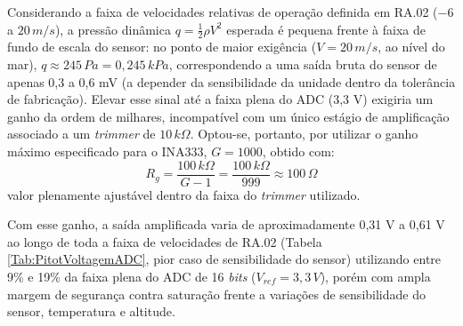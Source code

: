 Considerando a faixa de velocidades relativas de operação definida em RA.02 ($-6$ a $20\,m/s$), a pressão dinâmica $q = \frac{1}{2}\rho V^2$ esperada é pequena frente à faixa de fundo de escala do sensor: no ponto de maior exigência ($V = 20\,m/s$, ao nível do mar), $q \approx 245\,Pa = 0,245\,kPa$, correspondendo a uma saída bruta do sensor de apenas 0,3 a 0,6 mV (a depender da sensibilidade da unidade dentro da tolerância de fabricação). Elevar esse sinal até a faixa plena do ADC (3,3 V) exigiria um ganho da ordem de milhares, incompatível com um único estágio de amplificação associado a um \textit{trimmer} de $10\,k\Omega$. Optou-se, portanto, por utilizar o ganho máximo especificado para o INA333, $G=1000$, obtido com:
\begin{equation}
R_g = \frac{100\,k\Omega}{G-1} = \frac{100\,k\Omega}{999} \approx 100\,\Omega
\end{equation}
valor plenamente ajustável dentro da faixa do \textit{trimmer} utilizado.

Com esse ganho, a saída amplificada varia de aproximadamente 0,31 V a 0,61 V ao longo de toda a faixa de velocidades de RA.02 (Tabela \ref{Tab:PitotVoltagemADC}, pior caso de sensibilidade do sensor) utilizando entre 9\% e 19\% da faixa plena do ADC de 16 \textit{bits} ($V_{ref} = 3,3\,V$), porém com ampla margem de segurança contra saturação frente a variações de sensibilidade do sensor, temperatura e altitude.

\begin{table}[H]
\centering
\caption{Tensão amplificada e contagem do ADC em função da velocidade relativa ($G=1000$, pior caso de sensibilidade do sensor).}
\caption*{Fonte: Produzido pelo autor.}
\label{Tab:PitotVoltagemADC}
\end{table}

